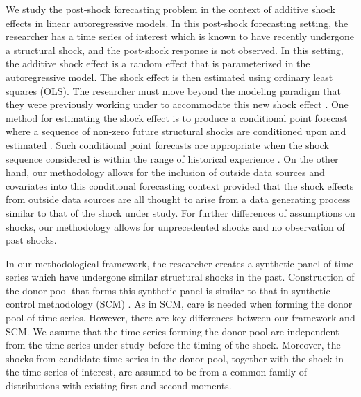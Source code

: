\documentclass[11pt]{article}
\theoremstyle{definition}
\begin{document}
We study the post-shock forecasting problem in the context of additive shock effects in linear autoregressive models. In this post-shock forecasting setting, the researcher has a time series of interest which is known to have recently undergone a structural shock, and the post-shock response is not observed. In this setting, the additive shock effect is a random effect that is parameterized in the autoregressive model. The shock effect is then estimated using ordinary least squares (OLS). The researcher must move beyond the modeling paradigm that they were previously working under to accommodate this new shock effect \citep{monti2008forecast, svensson2005monetary}. One method for estimating the shock effect is to produce a conditional point forecast where a sequence of non-zero future structural shocks are conditioned upon and estimated \citep{baumeister2014real}. Such conditional point forecasts are appropriate when the shock sequence considered is within the range of historical experience \citep{kilian2017structural}. On the other hand, our methodology allows for the inclusion of outside data sources and covariates into this conditional forecasting context provided that the shock effects from outside data sources are all thought to arise from a  data generating process similar to that of the shock under study. For further differences of assumptions on shocks, our methodology allows for unprecedented shocks and no observation of past shocks. 

In our methodological framework, the researcher creates a synthetic panel of time series which have undergone similar structural shocks in the past. Construction of the donor pool that forms this synthetic panel is similar to that in synthetic control methodology (SCM) \citep{abadie2010synthetic}. As in SCM, care is needed when forming the donor pool of time series. However, there are key differences between our framework and SCM. We assume that the time series forming the donor pool are independent from the time series under study before the timing of the shock. Moreover, the shocks from candidate time series in the donor pool, together with the shock in the time series of interest, are assumed to be  from a common family of distributions with existing first and second moments. 
\end{document}
